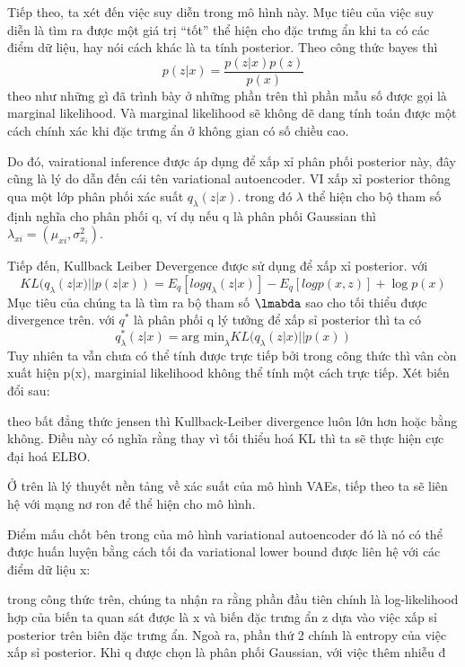        Tiếp theo, ta xét đến việc suy diễn trong mô hình này. 
        Mục tiêu của việc suy diễn là tìm ra được một giá trị ``tốt'' thể hiện cho đặc trưng ẩn khi ta có các điểm dữ liệu, hay nói cách khác là ta tính posterior.
        Theo công thức bayes thì 
        $$p(z|x) = \frac{p(z|x)p(z)}{p(x)}$$
        theo như những gì đã trình bày ở những phần trên thì phần mẫu số được gọi là marginal likelihood. 
        Và marginal likelihood sẽ không dẽ dang tính toán được một cách chính xác khi đặc trưng ẩn ở không gian có số chiều cao. 

        Do đó, vairational inference được áp dụng để xấp xỉ phân phối posterior này, đây cũng là lý do dẫn đến cái tên variational autoencoder.
        VI xấp xỉ posterior thông qua một lớp phân phối xác suất $q_\lambda(z|x)$.
        trong đó $\lambda$ thể hiện cho bộ tham số định nghĩa cho phân phối q, ví dụ nếu q là phân phối Gaussian thì $\lambda_{xi} = (\mu_{xi},\sigma^2_{x_i})$.
        
        Tiếp đến, Kullback Leiber Devergence được sử dụng để xấp xỉ posterior. 
        với $$KL(q_\lambda(z|x) || p (z|x)) = E_q[log q_\lambda(z|x)] - E_q[log p(x,z)] + \log p(x)$$
        Mục tiêu của chúng ta là tìm ra bộ tham số $\lmabda$ sao cho tối thiểu được divergence trên. với $q^*$ là phân phối q lý tưởng để xấp sỉ posterior thì ta có
        $$q^*_\lambda(z|x) = \text{arg min}_\lambda KL(q_\lambda(z|x)|| p(x))$$
        Tuy nhiên ta vẫn chưa có thể tính được trực tiếp bởi trong công thức thì vân còn xuất hiện p(x), marginial likelihood không thể tính một cách trực tiếp. 
        Xét biến đổi sau:


        theo bất đẳng thức jensen thì Kullback-Leiber divergence luôn lớn hơn hoặc bằng không. 
        Điều này có nghĩa rằng thay vì tối thiểu hoá KL thì ta sẽ thực hiện cực đại hoá ELBO.
        
        Ở trên là lý thuyết nền tảng về xác suất của mô hình VAEs, tiếp theo ta sẽ liên hệ với mạng nơ ron để thể hiện cho mô hình.
        


        Điểm mấu chốt bên trong của mô hình variational autoencoder đó là nó có thể được huấn luyện bằng cách tối đa variational lower bound được liên hệ với các điểm dữ liệu x:

        trong công thức trên, chúng ta nhận ra rằng phần đầu tiên chính là log-likelihood hợp của biến ta quan sát được là x và biến đặc trưng ẩn z dựa vào việc xấp sỉ posterior trên biên đặc trưng ẩn. 
        Ngoà ra, phần thứ 2 chính là entropy của việc xấp sỉ posterior. 
        Khi q được chọn là phân phối Gaussian, với việc thêm nhiễu đ

  
        
        

       
